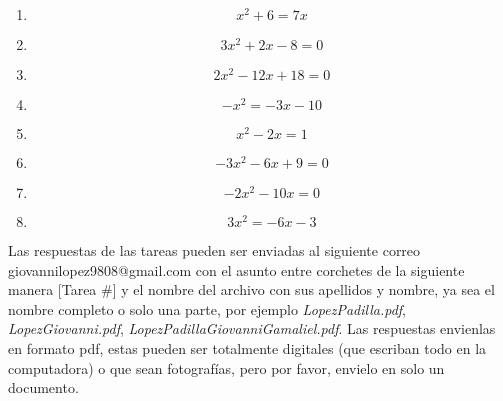 \documentclass[12pt,letterpaper]{report}
\begin{document}
\begin{enumerate}
\begin{equation*}
\end{equation*}
\item \begin{equation*}
    x^2+6=7x
\end{equation*}
\item \begin{equation*}
    3x^2+2x-8=0
\end{equation*}
\item \begin{equation*}
    2x^2-12x+18=0
\end{equation*}
\item \begin{equation*}
    -x^2=-3x-10
\end{equation*}
\item \begin{equation*}
    x^2-2x=1
\end{equation*}
\item \begin{equation*}
    -3x^2-6x+9=0
\end{equation*}
\item \begin{equation*}
    -2x^2-10x=0
\end{equation*}
\item \begin{equation*}
    3x^2=-6x-3
\end{equation*}
\end{enumerate}
Las respuestas de las tareas pueden ser enviadas al siguiente correo giovannilopez9808@gmail.com con el asunto entre corchetes de la siguiente manera [Tarea \#] y el nombre del archivo con sus apellidos y nombre, ya sea el nombre completo o solo una parte, por ejemplo \textit{LopezPadilla.pdf}, \textit{LopezGiovanni.pdf}, \textit{LopezPadillaGiovanniGamaliel.pdf}. Las respuestas envienlas en formato pdf, estas pueden ser totalmente digitales (que escriban todo en la computadora) o que sean fotografías, pero por favor, envielo en solo un documento.
\end{document}

